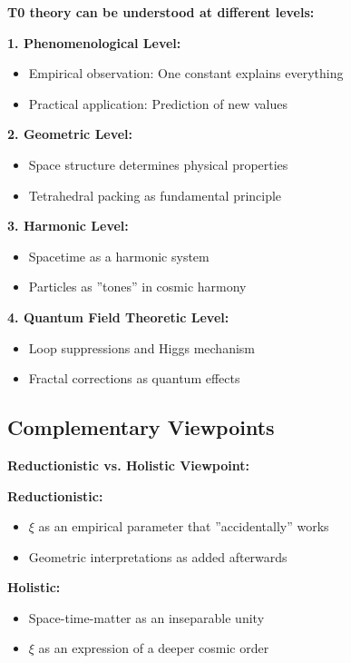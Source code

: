 	\begin{foundation}
		\textbf{T0 theory can be understood at different levels:}
		
		\textbf{1. Phenomenological Level:}
		\begin{itemize}
			\item Empirical observation: One constant explains everything
			\item Practical application: Prediction of new values
		\end{itemize}
		
		\textbf{2. Geometric Level:}
		\begin{itemize}
			\item Space structure determines physical properties
			\item Tetrahedral packing as fundamental principle
		\end{itemize}
		
		\textbf{3. Harmonic Level:}
		\begin{itemize}
			\item Spacetime as a harmonic system
			\item Particles as ''tones'' in cosmic harmony
		\end{itemize}
		
		\textbf{4. Quantum Field Theoretic Level:}
		\begin{itemize}
			\item Loop suppressions and Higgs mechanism
			\item Fractal corrections as quantum effects
		\end{itemize}
	\end{foundation}
	
	\subsection{Complementary Viewpoints}
	
	\begin{alternative}
		\textbf{Reductionistic vs. Holistic Viewpoint:}
		
		\textbf{Reductionistic:}
		\begin{itemize}
			\item $\xi$ as an empirical parameter that ''accidentally'' works
			\item Geometric interpretations as added afterwards
		\end{itemize}
		
		\textbf{Holistic:}
		\begin{itemize}
			\item Space-time-matter as an inseparable unity
			\item $\xi$ as an expression of a deeper cosmic order
		\end{itemize}
	\end{alternative}
	
